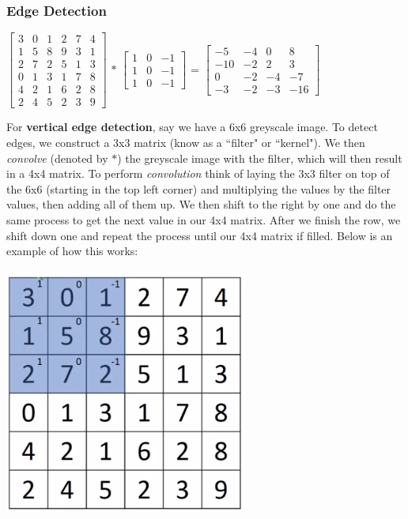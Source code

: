 \documentclass[11pt, a4paper]{article}
\begin{document}
\begin{spacing}{1.1}
	\subsubsection{Edge Detection}
	\begin{center}
	$\begin{bmatrix}
	3 & 0 & 1 & 2 & 7 & 4 \\ 1 & 5 & 8 & 9 & 3 & 1 \\ 2 & 7 & 2 & 5 & 1 & 3 \\ 0 & 1 & 3 & 1 & 7 & 8 \\ 4 & 2 & 1 & 6 & 2 & 8 \\ 2 & 4 & 5 & 2 & 3 & 9\end{bmatrix} $ $*$ $\begin{bmatrix} 1 & 0 & -1 \\ 1 & 0 & -1 \\ 1 & 0 & -1 \end{bmatrix}$ = $ \begin{bmatrix}
	-5 & -4 & 0 & 8 \\ -10 & -2 & 2 & 3 \\ 0 & -2 & -4 & -7 \\ -3 & -2 & -3 & -16 \end{bmatrix}$
	\end{center}
	For \textbf{vertical edge detection}, say we have a 6x6 greyscale image. To detect edges, we construct a 3x3 matrix (know as a ``filter" or ``kernel"). We then \textit{convolve} (denoted by $*$) the greyscale image with the filter, which will then result in a 4x4 matrix. To perform \textit{convolution} think of laying the 3x3 filter on top of the 6x6 (starting in the top left corner) and multiplying the values by the filter values, then adding all of them up. We then shift to the right by one and do the same process to get the next value in our 4x4 matrix. After we finish the row, we shift down one and repeat the process until our 4x4 matrix if filled. Below is an example of how this works:
	\begin{center}
	\includegraphics[scale=.5]{edge_dect}

\end{center}
\end{spacing}
\end{document}

